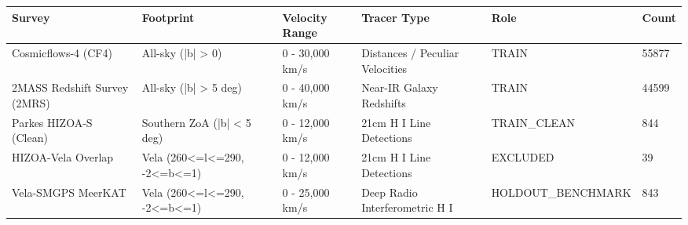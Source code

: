 \begin{tabular}{llllll}
\hline
Survey & Footprint & Velocity Range & Tracer Type & Role & Count \\
\hline
Cosmicflows-4 (CF4) & All-sky (|b| > 0) & 0 - 30,000 km/s & Distances / Peculiar Velocities & TRAIN & 55877 \\
2MASS Redshift Survey (2MRS) & All-sky (|b| > 5 deg) & 0 - 40,000 km/s & Near-IR Galaxy Redshifts & TRAIN & 44599 \\
Parkes HIZOA-S (Clean) & Southern ZoA (|b| < 5 deg) & 0 - 12,000 km/s & 21cm H I Line Detections & TRAIN\_CLEAN & 844 \\
HIZOA-Vela Overlap & Vela (260<=l<=290, -2<=b<=1) & 0 - 12,000 km/s & 21cm H I Line Detections & EXCLUDED & 39 \\
Vela-SMGPS MeerKAT & Vela (260<=l<=290, -2<=b<=1) & 0 - 25,000 km/s & Deep Radio Interferometric H I & HOLDOUT\_BENCHMARK & 843 \\
\hline
\end{tabular}
